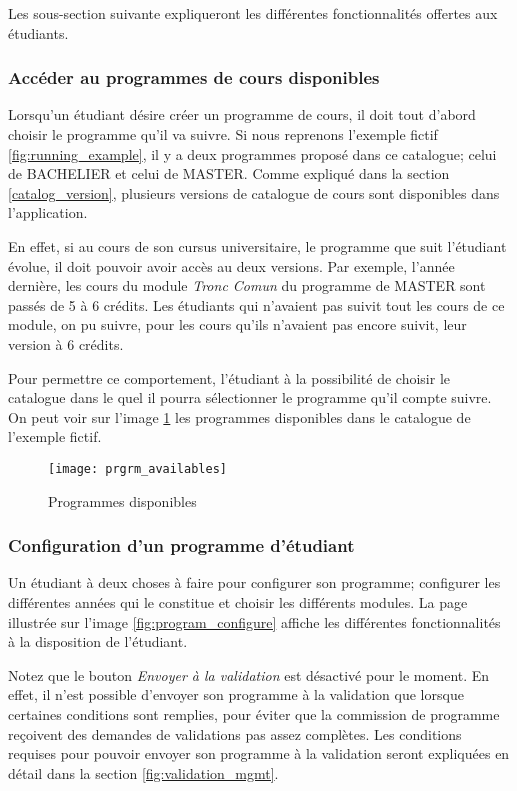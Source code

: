 Les sous-section suivante expliqueront les différentes fonctionnalités offertes aux étudiants. 


\subsubsection{Accéder au programmes de cours disponibles}
Lorsqu'un étudiant désire créer un programme de cours, il doit tout d'abord choisir le programme qu'il va suivre. Si nous reprenons l'exemple fictif \ref{fig:running_example}, il y a deux programmes proposé dans ce catalogue; celui de BACHELIER et celui de MASTER. Comme expliqué dans la section \ref{catalog_version}, plusieurs versions de catalogue de cours sont disponibles dans l'application. 

En effet, si au cours de son cursus universitaire, le programme que suit l'étudiant évolue, il doit pouvoir avoir accès au deux versions. Par exemple, l'année dernière, les cours du module \textit{Tronc Comun} du programme de MASTER sont passés de 5 à 6 crédits. Les étudiants qui n'avaient pas suivit tout les cours de ce module, on pu suivre, pour les cours qu'ils n'avaient pas encore suivit, leur version à 6 crédits. 

Pour permettre ce comportement, l'étudiant à la possibilité de choisir le catalogue dans le quel il pourra sélectionner le programme qu'il compte suivre. On peut voir sur l'image \ref{fig:prgrm_availables} les programmes disponibles dans le catalogue de l'exemple fictif. 

\begin{figure}
\centering
\caption{Programmes disponibles}
\label{fig:prgrm_availables}
\texttt{[image: prgrm\_availables]}
\end{figure}
\subsubsection{Configuration d'un programme d'étudiant}
\label{prgrm_mgmt}
Un étudiant à deux choses à faire pour configurer son programme; configurer les différentes années qui le constitue et choisir les différents modules. La page illustrée sur l'image \ref{fig:program_configure} affiche les différentes fonctionnalités à la disposition de l'étudiant. 

Notez que le bouton \textit{Envoyer à la validation} est désactivé pour le moment. En effet, il n'est possible d'envoyer son programme à la validation que lorsque certaines conditions sont remplies, pour éviter que la commission de programme reçoivent des demandes de validations pas assez complètes. Les conditions requises pour pouvoir envoyer son programme à la validation seront expliquées en détail dans la section \ref{fig:validation_mgmt}. 

